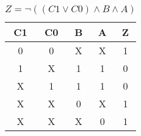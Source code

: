 
\begin{center}
    \begin{table}[h] \caption{\(Z = \lnot ((C1 \lor C0) \land B \land A) \)}
        \begin{center}
            \begin{tabular}{|c|c|c|c||c|} \hline
            C1 & C0 & B & A & Z \\ \hline\hline
            0  & 0  & X & X & 1 \\ \hline
            1  & X  & 1 & 1 & 0 \\ \hline
            X  & 1  & 1 & 1 & 0 \\ \hline
            X  & X  & 0 & X & 1 \\ \hline
            X  & X  & X & 0 & 1 \\ \hline
            \end{tabular}
        \end{center}
    \end{table}
\end{center}
